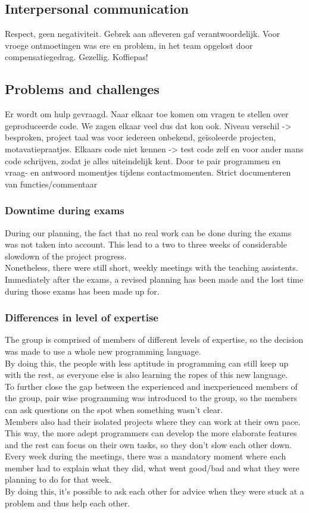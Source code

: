 \documentclass[10pt,a4paper]{report}
\begin{document}
{		\subsection{Interpersonal communication}
Respect, geen negativiteit. Gebrek aan afleveren gaf verantwoordelijk. Voor vroege ontmoetingen was ere en problem, in het team opgelost door compensatiegedrag. Gezellig. Koffiepas! 

		\subsection{Problems and challenges}
Er wordt om hulp gevraagd. Naar elkaar toe komen om vragen te stellen over geproduceerde code. We zagen elkaar veel dus dat kon ook.
	Niveau verschil -> besproken, project taal was voor iedereen onbekend, geïsoleerde projecten, motavatiepraatjes.
Elkaars code niet kennen -> test code zelf en voor ander mans code schrijven, zodat je alles uiteindelijk kent. Door te pair programmen en vraag- en antwoord momentjes tijdens contactmomenten. Strict documenteren van functies/commentaar
			\subsubsection*{Downtime during exams}
				During our planning, the fact that no real work can be done during the exams was not taken into account. This lead to a two to three weeks of considerable slowdown of the project progress.\\
				Nonetheless, there were still short, weekly meetings with the teaching assistents. Immediately after the exams, a revised planning has been made and the lost time during those exams has been made up for.
			\subsubsection*{Differences in level of expertise}
				The group is comprised of members of different levels of expertise, so the decision was made to use a whole new programming language.\\ 
				By doing this, the people with less aptitude in programming can still keep up with the rest, as everyone else is also learning the ropes of this new language.\\
				To further close the gap between the experienced and inexperienced members of the group, pair wise programming was introduced to the group, so the members can ask questions on the spot when something wasn't clear.\\
				Members also had their isolated projects where they can work at their own pace. This way, the more adept programmers can develop the more elaborate features and the rest can focus on their own tasks, so they don't slow each other down.\\ 
				Every week during the meetings, there was a mandatory moment where each member had to explain what they did, what went good/bad and what they were planning to do for that week.\\ 
				By doing this, it's possible to ask each other for advice when they were stuck at a problem and thus help each other.
}
\end{document}
